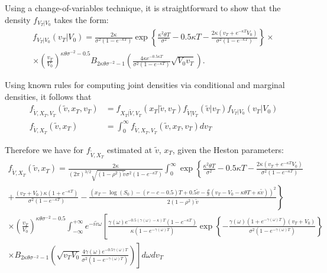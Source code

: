 \documentclass{rQUF2e}
\theoremstyle{plain}
\theoremstyle{definition}
\begin{document}
	Using a change-of-variables technique, it is straightforward to show that the density $f_{V_T|V_0}$ takes the form:
	\begin{multline*}
	f_{V_T|V_0} (v_T|V_0)= \frac{2 \kappa}{\sigma^2 (1 - e^{-\kappa T})} \exp \left\{ \frac{\kappa^2 \theta T}{\sigma^2} - 0.5 \kappa T - \frac{2 \kappa (v_T + e^{-\kappa T} V_0)}{\sigma^2 (1 - e^{-\kappa T})} \right\} \times \\ \times \left( \frac{v_T}{V_0} \right)^{\kappa \theta \sigma^{-2} - 0.5} B_{2 \kappa \theta \sigma^{-2} - 1} \left( \frac{4 \kappa e^{-0.5 \kappa T}}{\sigma^2 (1 - e^{-\kappa T})} \sqrt{V_0 v_T} \right).
	\end{multline*}
	
	Using known rules for computing joint densities via conditional and marginal densities, it follows that
	\begin{align*}
	f_{\widetilde{V}, X_T, V_T} (\widetilde{v}, x_T, v_T) &= f_{X_T|\widetilde{V}, V_T} (x_T|\widetilde{v}, v_T) f_{\widetilde{V}|V_T}(\widetilde{v}|v_T) f_{V_T|V_0} (v_T|V_0) \\
	f_{\widetilde{V}, X_T} (\widetilde{v}, x_T) &= \int_{0}^{\infty} f_{\widetilde{V}, X_T, V_T} (\widetilde{v}, x_T, v_T) d v_T
	\end{align*}
	
	Therefore we have for $f_{\widetilde{V}, X_T}$ estimated at $\widetilde{v}$, $x_T$, given the Heston parameters:
	\begin{multline*}
	f_{\widetilde{V}, X_T} (\widetilde{v}, x_T) = \frac{2 \kappa}{(2 \pi)^{3/2} \sqrt{(1 - \rho^2) \widetilde{v}} \sigma^2 (1 - e^{-\kappa T})} \int_{0}^{\infty} \exp \left\{ \frac{\kappa^2 \theta T}{\sigma^2} - 0.5 \kappa T - \frac{2 \kappa (v_T + e^{-\kappa T} V_0)}{\sigma^2 (1 - e^{-\kappa T})}  \right. \\ \left. + \frac{(v_T + V_0)\kappa (1 + e^{-\kappa T})}{\sigma^2 (1 - e^{-\kappa T})} - \frac{ \left( x_T - \log(S_0) - (r-c-0.5)T + 0.5 \widetilde{v} - \frac{\rho}{\sigma} (v_T - V_0 - \kappa \theta T + \kappa \widetilde{v}) \right)^2 }{2 (1 - \rho^2) \widetilde{v}} \right\} \\ \times \left( \frac{v_T}{V_0} \right)^{\kappa \theta \sigma^{-2} - 0.5} \int_{-\infty}^{+\infty} e^{-i \widetilde{v} \omega} \left[ \frac{\gamma(\omega)e^{-0.5(\gamma(\omega) - \kappa)T}(1 - e^{-\kappa T})}{\kappa (1 - e^{-\gamma(\omega)T})} \exp \left\{ - \frac{\gamma(\omega) (1 + e^{-\gamma(\omega) T}) (v_T + V_0)}{\sigma^2 (1 - e^{-\gamma(\omega) T})} \right\} \right. \\
	\left. \times B_{2 \kappa \theta \sigma^{-2} - 1} \left( \sqrt{v_T V_0} \frac{4 \gamma(\omega) e^{-0.5 \gamma(\omega) T}}{\sigma^2 (1 - e^{-\gamma(\omega) T})} \right) \right] d \omega d v_T
	\end{multline*}
	
\end{document}

